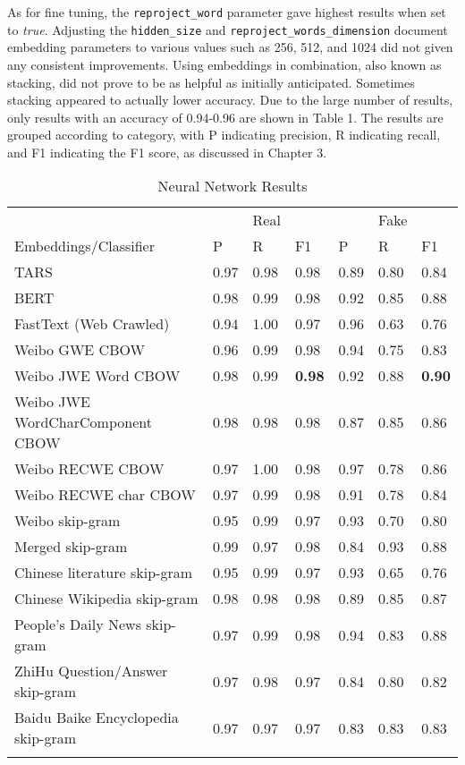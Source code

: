 \documentclass [11pt, proquest] {uwthesis}[2020/02/24]
\begin{document}
As for fine tuning, the \texttt{reproject\_word} parameter gave highest results when set to \textit{true}. Adjusting the \texttt{hidden\_size} and \texttt{reproject\_words\_dimension} document embedding parameters to various values such as 256, 512, and 1024 did not given any consistent improvements. Using embeddings in combination, also known as stacking, did not prove to be as helpful as initially anticipated. Sometimes stacking appeared to actually lower accuracy.  Due to the large number of results, only results with an accuracy of 0.94-0.96 are shown in Table 1. The results are grouped according to category, with P indicating precision, R indicating recall, and F1 indicating the F1 score, as discussed in Chapter 3.
\begin{longtable}{p{8cm}p{1cm}p{1cm}p{1cm}p{1cm}p{1cm}p{1cm}}
  &&Real&&&Fake\\
 Embeddings/Classifier&P&R&F1&P&R&F1\\
 \hline
 TARS&0.97&0.98&0.98&0.89&0.80&0.84\\
 BERT&0.98&0.99&0.98&0.92&0.85&0.88\\
 FastText (Web Crawled)&0.94&1.00&0.97&0.96&0.63&0.76\\
 Weibo GWE CBOW &0.96&0.99&0.98&0.94&0.75&0.83\\
 Weibo JWE Word CBOW &0.98&0.99&\textbf{0.98}&0.92&0.88&\textbf{0.90}\\
 Weibo JWE WordCharComponent CBOW &0.98&0.98&0.98&0.87&0.85&0.86\\
 Weibo RECWE CBOW &0.97&1.00&0.98&0.97&0.78&0.86\\
 Weibo RECWE char CBOW &0.97&0.99&0.98&0.91&0.78&0.84\\
 Weibo skip-gram&0.95&0.99&0.97&0.93&0.70&0.80\\
 Merged skip-gram &0.99&0.97&0.98&0.84&0.93&0.88\\
 Chinese literature skip-gram&0.95&0.99&0.97&0.93&0.65&0.76\\
 Chinese Wikipedia skip-gram&0.98&0.98&0.98&0.89&0.85&0.87\\
 People's Daily News skip-gram&0.97&0.99&0.98&0.94&0.83&0.88\\
 ZhiHu Question/Answer skip-gram&0.97&0.98&0.97&0.84&0.80&0.82\\
 Baidu Baike Encyclopedia skip-gram&0.97&0.97&0.97&0.83&0.83&0.83\\
 \hline
\caption{Neural Network Results}
\end{longtable}
\clearpage
\end{document}
